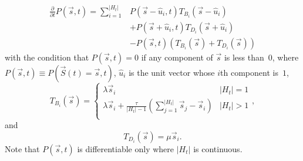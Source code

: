 \documentclass{article}
\begin{document}
            \begin{equation}
                \label{eq:master}
                \begin{split}
                    \frac{\partial}{\partial t} P\left(\vec{s},t\right) =
                    \sum_{i=1}^{\lvert{H_t}\rvert}
                    &P\left(\vec{s} - \hat{u}_i, t\right)T_{B_i}\left(\vec{s} -
                    \hat{u}_i\right) \\ &+ P\left(\vec{s} + \hat{u}_i,
                    t\right)T_{D_i}\left(\vec{s} + \hat{u}_i \right) \\ &-
                    P\left(\vec{s}, t\right)\left(T_{B_i}\left(\vec{s}\right) +
                    T_{D_i}\left(\vec{s} \right)\right)
                \end{split}
            \end{equation}
            with the condition that $P\left(\vec{s},t\right) = 0$ if any
            component of $\vec{s}$ is less than~$0$, where $P\left(\vec{s},
            t\right) \equiv P\left(\vec{S}\left(t\right)
            = \vec{s}, t\right)$, $\hat{u}_i$ is the unit vector whose $i$th
            component is~$1$,
            \begin{equation}
                T_{B_i}\left(\vec{s}\right) =
                \begin{cases}
                    \lambda \vec{s}_i & \lvert{H_t}\rvert = 1 \\
                    \lambda \vec{s}_i +
                    \frac{\tau}{\lvert{H_t}\rvert - 1}
                    \left(\sum_{j=1}^{\lvert{H_t}\rvert}
                    {\vec{s}_j}-\vec{s}_i\right) & \lvert{H_t}\rvert > 1 \\
                \end{cases},
            \end{equation}
            and
            \begin{equation}
                T_{D_i}\left(\vec{s}\right) = \mu \vec{s}_i.
            \end{equation}
            Note that $P\left(\vec{s},t\right)$ is differentiable only where
            $\lvert{H_t}\rvert$ is continuous.
\end{document}

